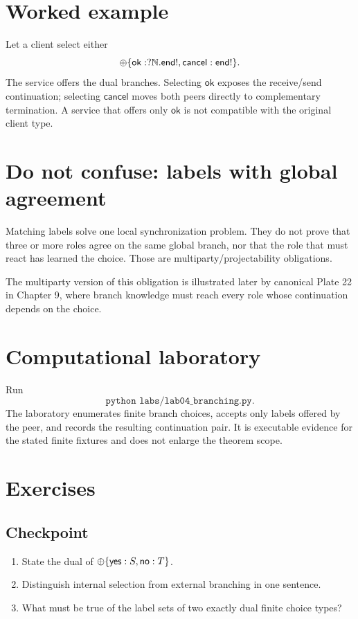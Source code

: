 \section{Worked example}
\begin{workedexample}
Let a client select either
\[
\oplus\{\mathsf{ok}:?\mathbb{N}.\mathsf{end!},
      \mathsf{cancel}:\mathsf{end!}\}.
\]
The service offers the dual branches. Selecting $\mathsf{ok}$ exposes the receive/send continuation; selecting $\mathsf{cancel}$ moves both peers directly to complementary termination. A service that offers only $\mathsf{ok}$ is not compatible with the original client type.
\end{workedexample}

\section{Do not confuse: labels with global agreement}
\begin{warningbox}
Matching labels solve one local synchronization problem. They do not prove that three or more roles agree on the same global branch, nor that the role that must react has learned the choice. Those are multiparty/projectability obligations.
\end{warningbox}

The multiparty version of this obligation is illustrated later by canonical Plate 22 in Chapter 9, where branch knowledge must reach every role whose continuation depends on the choice.

\section{Computational laboratory}
\begin{labbox}
Run
\[
  \texttt{python labs/lab04_branching.py}.
\]
The laboratory enumerates finite branch choices, accepts only labels offered by the peer, and records the resulting continuation pair. It is executable evidence for the stated finite fixtures and does not enlarge the theorem scope.
\end{labbox}

\section{Exercises}
\subsection*{Checkpoint}
\begin{enumerate}[label=\textbf{4.\arabic*},start=1]
\item State the dual of $\oplus\{\mathsf{yes}:S,\mathsf{no}:T\}$.
\item Distinguish internal selection from external branching in one sentence.
\item What must be true of the label sets of two exactly dual finite choice types?
\end{enumerate}
